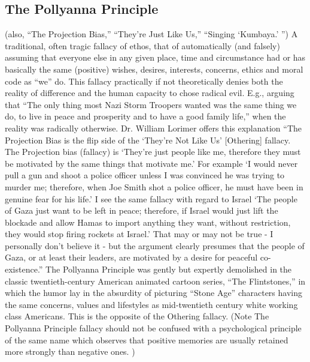 \documentclass[10pt,a4paper,british]{article}
\begin{document}
\begin{multicols}{2}
	\subsection{The Pollyanna Principle} (also, ``The Projection Bias,''
	``They're Just Like Us,'' ``Singing `Kumbaya.' '')  A traditional, often
	tragic fallacy of ethos, that of automatically (and falsely) assuming that
	everyone else in any given place, time and circumstance had or has
	basically the same (positive) wishes, desires, interests, concerns, ethics
	and moral code as ``we'' do. This fallacy practically if not theoretically
	denies both the reality of difference and the human capacity to chose
	radical evil.  E.g., arguing that ``The only thing most Nazi Storm Troopers
	wanted was the same thing we do, to live in peace and prosperity and to
	have a good family life,'' when the reality was radically otherwise. Dr.
	William Lorimer offers this explanation ``The Projection Bias is the flip
	side of the `They're Not Like Us' [Othering] fallacy. The Projection bias
	(fallacy) is `They're just people like me, therefore they must be motivated
	by the same things that motivate me.' For example `I would never pull a gun
	and shoot a police officer unless I was convinced he was trying to murder
	me; therefore, when Joe Smith shot a police officer, he must have been in
	genuine fear for his life.' I see the same fallacy with regard to Israel
	`The people of Gaza just want to be left in peace; therefore, if Israel
	would just lift the blockade and allow Hamas to import anything they want,
	without restriction, they would stop firing rockets at Israel.' That may or
	may not be true {-} I personally don't believe it {-} but the argument
	clearly presumes that the people of Gaza, or at least their leaders, are
	motivated by a desire for peaceful co{-}existence.'' The Pollyanna
	Principle was gently but expertly demolished in the classic
	twentieth{-}century American animated cartoon series, ``The Flintstones,''
	in which the humor lay in the absurdity of picturing ``Stone Age''
	characters having the same concerns, values and lifestyles as
	mid{-}twentieth century white working class Americans.  This is the
	opposite of the Othering fallacy. (Note The Pollyanna Principle fallacy
	should not be confused with a psychological principle of the same name
	which observes that positive memories are usually retained more strongly
	than negative ones. )   


\end{multicols}
\end{document}
